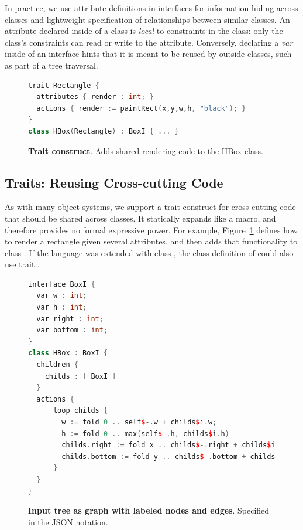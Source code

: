 In practice, we  use attribute definitions in interfaces for information hiding across classes and lightweight specification of relationships between similar classes. An attribute declared inside of a class is \emph{local} to constraints in the class: only the class's constraints can read or write to the attribute. Conversely, declaring a \emph{var} inside of an interface hints that it is meant to be reused by outside classes, such as part of a tree traversal.

\begin{figure}
\centering
\begin{minipage}{0.8\columnwidth}
\begin{lstlisting}[language=C++,morekeywords={trait,class,attributes,actions}]
trait Rectangle {
  attributes { render : int; }
  actions { render := paintRect(x,y,w,h, "black"); }
}
class HBox(Rectangle) : BoxI { ... }
\end{lstlisting}
\end{minipage}
\caption{\textbf{Trait construct}. Adds shared rendering code to the HBox class.}
\label{fig:trait}
\end{figure}

\subsection{Traits: Reusing Cross-cutting Code}
As with many object systems, we support a trait construct for cross-cutting code that should be shared across classes. It statically expands like a macro, and therefore provides no formal expressive power. For example, Figure~\ref{fig:trait} defines how to render a rectangle given several attributes, and then adds that functionality to class . If the language was extended with class , the class definition of  could also use trait .



\begin{figure}
\centering
\begin{minipage}{0.8\columnwidth}
\begin{lstlisting}[language=C++,morekeywords={spawn,join,reverse,parallel_for}]
interface BoxI {
  var w : int;
  var h : int;
  var right : int;
  var bottom : int;
}
class HBox : BoxI {
  children {
    childs : [ BoxI ]
  }
  actions {
      loop childs {
        w := fold 0 .. self$-.w + childs$i.w;
        h := fold 0 .. max(self$-.h, childs$i.h)
        childs.right := fold x .. childs$-.right + childs$i.w;
        childs.bottom := fold y .. childs$-.bottom + childs$i.h;  
      }
  }
}
\end{lstlisting}
\end{minipage}
\caption{\textbf{Input tree as graph with labeled nodes and edges}. Specified in the JSON notation.}
\label{fig:loops}
\end{figure}


